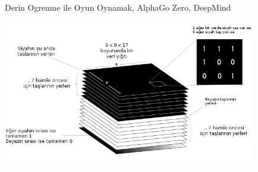 \documentclass[12pt,fleqn]{article}\usepackage{../../common}
\begin{document}
Derin Ogrenme ile Oyun Oynamak, AlphaGo Zero, DeepMind











\includegraphics[width=30em]{go_01.png}
\end{document}
